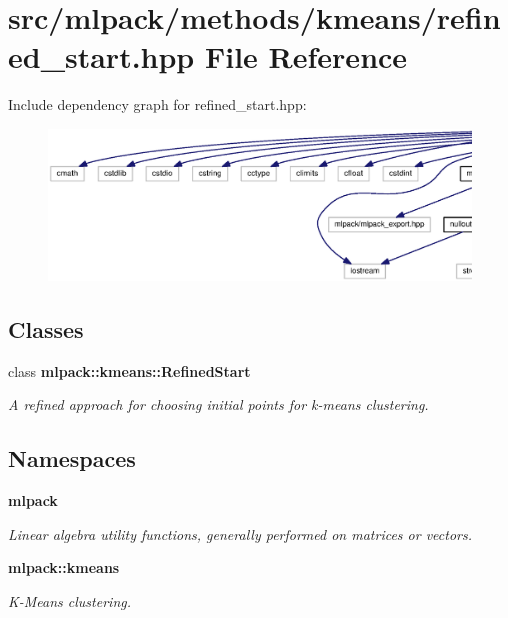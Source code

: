 \section{src/mlpack/methods/kmeans/refined\+\_\+start.hpp File Reference}
\label{refined__start_8hpp}
Include dependency graph for refined\+\_\+start.\+hpp\+:
\nopagebreak
\begin{figure}[H]
\begin{center}
\leavevmode
\includegraphics[width=350pt]{refined__start_8hpp__incl}
\end{center}
\end{figure}
\subsection*{Classes}
\begin{DoxyCompactItemize}
\item 
class {\bf mlpack\+::kmeans\+::\+Refined\+Start}
\begin{DoxyCompactList}\small\item\em A refined approach for choosing initial points for k-\/means clustering. \end{DoxyCompactList}\end{DoxyCompactItemize}
\subsection*{Namespaces}
\begin{DoxyCompactItemize}
\item 
 {\bf mlpack}
\begin{DoxyCompactList}\small\item\em Linear algebra utility functions, generally performed on matrices or vectors. \end{DoxyCompactList}\item 
 {\bf mlpack\+::kmeans}
\begin{DoxyCompactList}\small\item\em K-\/\+Means clustering. \end{DoxyCompactList}\end{DoxyCompactItemize}


